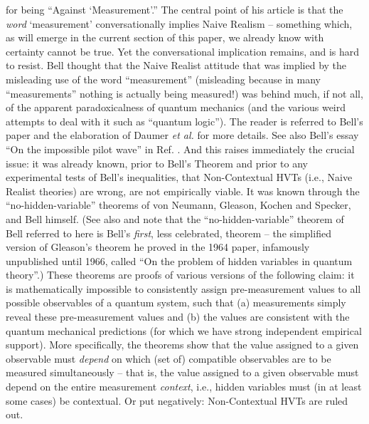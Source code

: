 \documentclass[12pt]{article}
\begin{document}
{  for being ``Against `Measurement'.''  The central point of his
  article is that the \emph{word} `measurement' conversationally
  implies Naive Realism -- something which, as will emerge in the
  current section of this paper, we already know with certainty cannot
  be true.  Yet the conversational implication remains, and is hard to
  resist.  Bell thought that the Naive Realist attitude that was
  implied by the misleading use of the word ``measurement'' (misleading
  because in many ``measurements'' nothing is actually being
  measured!) was behind much, if not all, of the apparent
  paradoxicalness of quantum mechanics (and the various weird attempts
  to deal with it such as ``quantum logic'').  The reader is referred
  to Bell's paper and the elaboration of Daumer \emph{et al.} for more
  details.  See also Bell's essay ``On the impossible pilot wave'' in
  Ref. \cite{bell}.}
And this raises immediately the crucial issue:  it was already known,
prior to Bell's Theorem and prior to any experimental tests of Bell's
inequalities, that Non-Contextual HVTs (i.e., Naive Realist theories)
are wrong, are not empirically viable.  It was known through the
``no-hidden-variable'' theorems of von Neumann, Gleason,
Kochen and Specker, and Bell himself.  \cite[pages 1-13, 159-168]{bell}  
(See also 
\cite{mermin2theorems} and note that the ``no-hidden-variable''
theorem of Bell referred to here is Bell's \emph{first}, less
celebrated, theorem -- the simplified version of Gleason's theorem he 
proved in the 1964 paper, infamously unpublished until 1966,
called ``On the problem of hidden variables in quantum theory''.) 
These theorems are proofs of
various versions of the following claim:  it is mathematically impossible to
consistently assign pre-measurement values to all possible observables
of a quantum system, such that (a) measurements simply reveal these
pre-measurement values and (b) the values are consistent with the
quantum mechanical predictions (for which we have strong independent
empirical support).  More specifically, the theorems show that the
value assigned to a given observable must
\emph{depend} on which (set of) compatible observables are to be
measured simultaneously -- that is, the value assigned to a given
observable must depend on the entire measurement \emph{context}, i.e.,
hidden variables must (in at least some cases) be contextual.   Or put
negatively:  Non-Contextual HVTs are ruled out.
\end{document}
